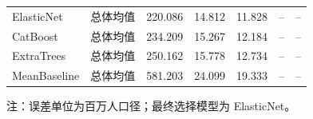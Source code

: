 \begin{table}[H]
{\begin{tabular}{llrrrrr}
ElasticNet & 总体均值 & 220.086 & 14.812 & 11.828 & -- & -- \\
CatBoost & 总体均值 & 234.209 & 15.267 & 12.184 & -- & -- \\
ExtraTrees & 总体均值 & 250.162 & 15.778 & 12.734 & -- & -- \\
MeanBaseline & 总体均值 & 581.203 & 24.099 & 19.333 & -- & -- \\
\bottomrule
\end{tabular}
}
\vspace{2pt}
\noindent\begin{minipage}{0.96\textwidth}\footnotesize 注：误差单位为百万人口径；最终选择模型为 ElasticNet。\end{minipage}
\end{table}
